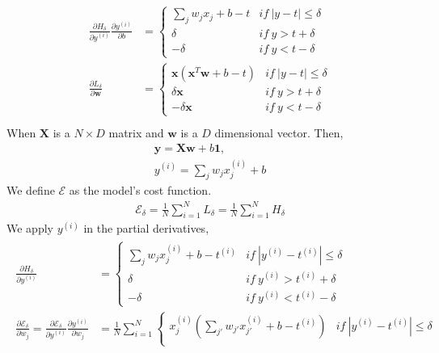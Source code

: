 \documentclass{myhw}
\begin{document}
\begin{homeworkProblem}
\begin{homeworkSection}
\begin{gather*}
\begin{aligned}
\frac{\partial H_\delta}{\partial y^{(i)}} \frac{\partial y^{(i)}}{\partial b} & = 
	\left\{ 
	\begin{array}{lr} 
	\sum_{j}{w_{j} x_{j} + b - t} & if\ |y-t| \le \delta \\ 
	\delta & if\ y > t + \delta \\
	- \delta & if\ y < t - \delta
	\end{array} \right.
\\
\frac{\partial L_\delta}{\partial \textbf{w}} & = 
	\left\{ 
	\begin{array}{lr} 
	\textbf{x}(\textbf{x}^T\textbf{w} + b - t) & if\ |y-t| \le \delta \\ 
	\delta \textbf{x} & if\ y > t + \delta \\
	- \delta \textbf{x} & if\ y < t - \delta
	\end{array} \right.
\\
\end{aligned}
\end{gather*}
When $\textbf{X}$ is a $N \times D$ matrix and $\textbf{w}$ is a $D$ dimensional vector. 
Then, 
\begin{gather*}
\textbf{y}=\textbf{X}\textbf{w}+b\textbf{1}, \\ y^{(i)} = \sum_j{w_j x_j^{(i)} + b}
\end{gather*}
We define $\mathscr{E}$ as the model's cost function.
\begin{gather*}
\mathscr{E}_\delta = \frac{1}{N}\sum_{i=1}^N{L_\delta} = \frac{1}{N}\sum_{i=1}^N{H_\delta}
\end{gather*}
We apply $y^{(i)}$ in the partial derivatives, 
\begin{gather*}
\begin{aligned}
\frac{\partial H_\delta}{\partial y^{(i)}} & = 
	\left\{ 
	\begin{array}{lr} 
	\sum_j{w_j x_j^{(i)} + b} - t^{(i)} & if\ |y^{(i)}-t^{(i)}| \le \delta \\ 
	\delta & if\ y^{(i)} > t^{(i)} + \delta \\
	- \delta & if\ y^{(i)} < t^{(i)} - \delta
	\end{array} \right.
\\
\frac{\partial \mathscr{E}_\delta}{\partial w_j} = 
\frac{\partial \mathscr{E}_\delta}{\partial y^{(i)}} \frac{\partial y^{(i)}}{\partial w_j} & = 
	\frac{1}{N} \sum_{i=1}^N
	\left\{ 
	\begin{array}{lr} 
	{x_j^{(i)} (\sum_{j'}{w_{j'} x_{j'}^{(i)} + b} - t^{(i)})} & if\ |y^{(i)}-t^{(i)}| \le \delta \\ 

\end{array}
\end{aligned}
\end{gather*}
\end{homeworkSection}
\end{homeworkProblem}
\end{document}
